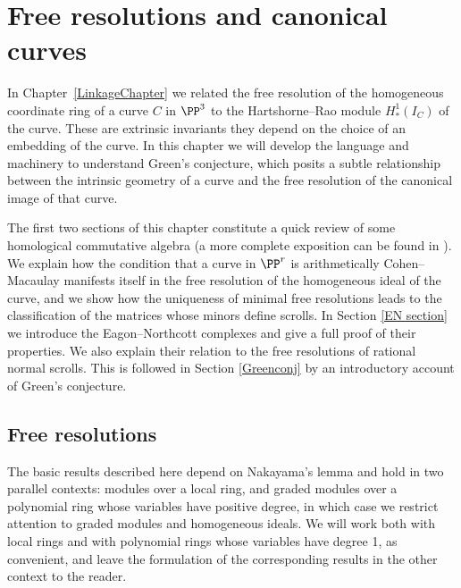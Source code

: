 

\chapter{Free resolutions and canonical curves}
\label{SyzygiesChapter}

\def\length{\mathrm{ length}}

In Chapter~\ref{LinkageChapter} we related the free resolution of the homogeneous
coordinate ring of a curve $C$
in $\PP^3$ to the Hartshorne--Rao module $H^{1}_{*}(I_{C})$ of the curve. These 
are extrinsic invariants \emdash they depend on the choice of an embedding of the curve.
 In this chapter we will develop the
language and machinery to understand Green's conjecture, which posits a
subtle relationship between the intrinsic geometry of a curve and the free resolution
of the canonical image of that curve.

The first two sections of this
chapter constitute a quick review of some
 homological commutative algebra 
(a more complete exposition can be found in \cite[Part III]{Eisenbud1995}).
We
  explain how the condition that a curve
in $\PP^r$ is arithmetically Cohen--Macaulay manifests itself in the
free resolution of the homogeneous ideal of the curve, and we show
how the uniqueness of minimal free resolutions leads to the
classification of the matrices whose minors define 
scrolls. In Section \ref{EN section} we
introduce the Eagon--Northcott complexes and give a full proof of their
properties. We also explain their relation to
the free resolutions of rational normal scrolls. 
This is followed in Section \ref{Greenconj} by an introductory account of 
Green's conjecture.

\section{Free resolutions}

The basic results described here depend on 
Nakayama's lemma and hold 
%
 in two parallel contexts:
modules over a local ring,
%
%
and
graded modules over a polynomial ring
%
%
whose variables have positive degree,  in which case we restrict attention
to graded modules and homogeneous ideals. 
We will work both with local rings and with
polynomial rings whose variables have degree 1,
as convenient, and leave the formulation of the corresponding results
in the other context to the reader.


